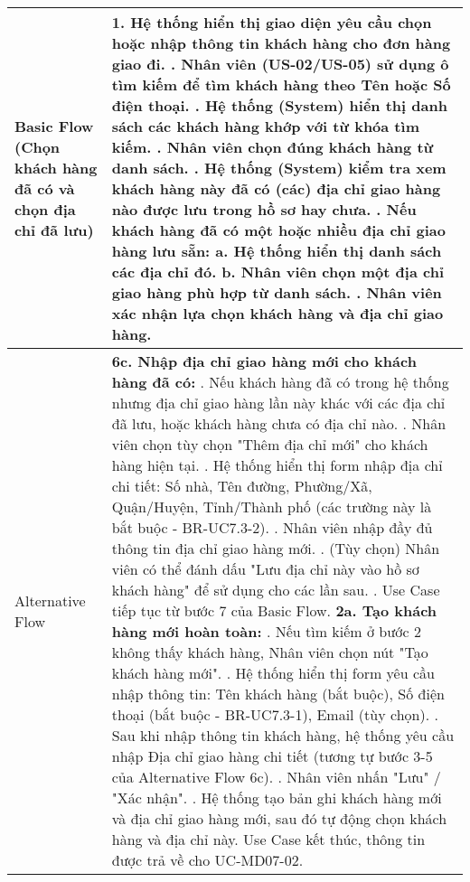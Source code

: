 \begin{longtable}{|m{4cm}|p{11cm}|}
Basic Flow (Chọn khách hàng đã có và chọn địa chỉ đã lưu) & 1. Hệ thống hiển thị giao diện yêu cầu chọn hoặc nhập thông tin khách hàng cho đơn hàng giao đi. \newline 2. Nhân viên (US-02/US-05) sử dụng ô tìm kiếm để tìm khách hàng theo Tên hoặc Số điện thoại. \newline 3. Hệ thống (System) hiển thị danh sách các khách hàng khớp với từ khóa tìm kiếm. \newline 4. Nhân viên chọn đúng khách hàng từ danh sách. \newline 5. Hệ thống (System) kiểm tra xem khách hàng này đã có (các) địa chỉ giao hàng nào được lưu trong hồ sơ hay chưa. \newline 6. \textbf{Nếu khách hàng đã có một hoặc nhiều địa chỉ giao hàng lưu sẵn:} \newline    a. Hệ thống hiển thị danh sách các địa chỉ đó. \newline    b. Nhân viên chọn một địa chỉ giao hàng phù hợp từ danh sách. \newline 7. Nhân viên xác nhận lựa chọn khách hàng và địa chỉ giao hàng. \\
\hline
Alternative Flow & \textbf{6c. Nhập địa chỉ giao hàng mới cho khách hàng đã có:} \newline    1. Nếu khách hàng đã có trong hệ thống nhưng địa chỉ giao hàng lần này khác với các địa chỉ đã lưu, hoặc khách hàng chưa có địa chỉ nào. \newline    2. Nhân viên chọn tùy chọn "Thêm địa chỉ mới" cho khách hàng hiện tại. \newline    3. Hệ thống hiển thị form nhập địa chỉ chi tiết: Số nhà, Tên đường, Phường/Xã, Quận/Huyện, Tỉnh/Thành phố (các trường này là bắt buộc - BR-UC7.3-2). \newline    4. Nhân viên nhập đầy đủ thông tin địa chỉ giao hàng mới. \newline    5. (Tùy chọn) Nhân viên có thể đánh dấu "Lưu địa chỉ này vào hồ sơ khách hàng" để sử dụng cho các lần sau. \newline    6. Use Case tiếp tục từ bước 7 của Basic Flow. \newline \textbf{2a. Tạo khách hàng mới hoàn toàn:} \newline    1. Nếu tìm kiếm ở bước 2 không thấy khách hàng, Nhân viên chọn nút "Tạo khách hàng mới". \newline    2. Hệ thống hiển thị form yêu cầu nhập thông tin: Tên khách hàng (bắt buộc), Số điện thoại (bắt buộc - BR-UC7.3-1), Email (tùy chọn). \newline    3. Sau khi nhập thông tin khách hàng, hệ thống yêu cầu nhập Địa chỉ giao hàng chi tiết (tương tự bước 3-5 của Alternative Flow 6c). \newline    4. Nhân viên nhấn "Lưu" / "Xác nhận". \newline    5. Hệ thống tạo bản ghi khách hàng mới và địa chỉ giao hàng mới, sau đó tự động chọn khách hàng và địa chỉ này. Use Case kết thúc, thông tin được trả về cho UC-MD07-02. \\

\end{longtable}
